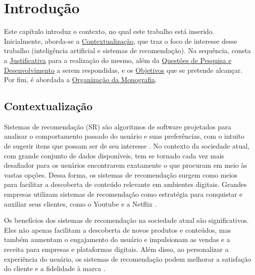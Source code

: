 \chapter[Introdução]{Introdução}

Este capítulo introduz o contexto, no qual este trabalho está inserido. Inicialmente, aborda-se a 
\hyperref[sec:contextualizacao]{Contextualização}, que traz o foco de interesse desse trabalho (inteligência 
artificial e sistemas de recomendação). Na sequência, consta a \hyperref[sec:justificativa]{Justificativa}
para a realização do mesmo, além da \hyperref[sec:questaopesquisa]{Questões de Pesquisa e Desenvolvimento} a serem respondidas, e os
\hyperref[sec:objetivos]{Objetivos} que se pretende alcançar. Por fim, é abordada a 
\hyperref[sec:organizacao]{Organização da Monografia}. 

\section{Contextualização}\label{sec:contextualizacao}
Sistemas de recomendação (SR) são algoritmos de software projetados para analisar o comportamento passado do usuário 
e suas preferências, com o intuito de sugerir itens que possam ser de seu interesse \cite{Subramaniam}. No contexto
da sociedade atual, com grande conjunto de dados disponíveis, tem se tornado cada vez mais desafiador para os usuários encontrarem 
exatamente o que procuram em meio às vastas opções. Dessa forma, os sistemas de recomendação surgem como
meios para facilitar a descoberta de conteúdo relevante em ambientes digitais. Grandes empresas utilizam 
sistemas de recomendação como estratégia para conquistar e auxiliar seus clientes, como o Youtube e a Netflix \cite{Zhang_Survey}.

Os benefícios dos sistemas de recomendação na sociedade atual são significativos. Eles não apenas facilitam a descoberta
de novos produtos e conteúdos, mas também aumentam o engajamento do usuário e impulsionam as vendas e a receita para
empresas e plataformas digitais. Além disso, ao personalizar a experiência do usuário, os sistemas de recomendação podem
melhorar a satisfação do cliente e a fidelidade à marca \cite{Gunawardana2022}.


